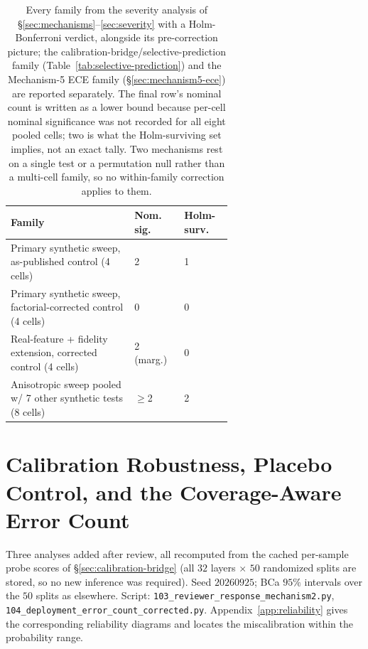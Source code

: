 \documentclass{article}
\begin{document}
\begin{table}[t]
\centering
\small
\begin{tabular}{@{}p{0.42\linewidth}p{0.10\linewidth}p{0.10\linewidth}@{}}
\toprule
Family & Nom. sig. & Holm-surv. \\
\midrule
Primary synthetic sweep, as-published control (4 cells) & 2 & 1 \\
Primary synthetic sweep, factorial-corrected control (4 cells) & 0 & 0 \\
Real-feature + fidelity extension, corrected control (4 cells) & 2 (marg.) & 0 \\
Anisotropic sweep pooled w/ 7 other synthetic tests (8 cells) & $\geq$2 & 2 \\
\bottomrule
\end{tabular}
\caption{Every family from the severity analysis of
\S\ref{sec:mechanisms}--\ref{sec:severity} with a Holm-Bonferroni verdict,
alongside its pre-correction picture; the calibration-bridge/selective-prediction
family (Table~\ref{tab:selective-prediction}) and the Mechanism-5 ECE family
(\S\ref{sec:mechanism5-ece}) are reported separately. The final row's nominal
count is written as a lower bound because per-cell nominal significance was
not recorded for all eight pooled cells; two is what the Holm-surviving set
implies, not an exact tally. Two mechanisms rest on
a single test or a permutation null rather than a multi-cell family, so no
within-family correction applies to them.}
\label{tab:holm}
\end{table}

\section{Calibration Robustness, Placebo Control, and the Coverage-Aware Error Count}
\label{app:reviewer-response}

Three analyses added after review, all recomputed from the cached per-sample
probe scores of \S\ref{sec:calibration-bridge} (all $32$ layers $\times$ $50$
randomized splits are stored, so no new inference was required). Seed
$20260925$; BCa $95\%$ intervals over the $50$ splits as elsewhere.
Script: \texttt{103\_reviewer\_response\_mechanism2.py},
\texttt{104\_deployment\_error\_count\_corrected.py}.
Appendix~\ref{app:reliability} gives the corresponding reliability diagrams and
locates the miscalibration within the probability range.
\end{document}
